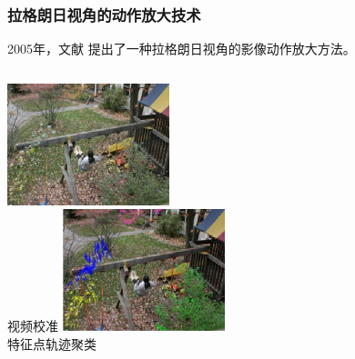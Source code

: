 \documentclass[xcolor=svgnames,serif,table]{beamer}
\begin{document}
\begin{frame}
  \frametitle{拉格朗日视角的动作放大技术}
  2005年，文献 \cite{liu2005motion} 提出了一种拉格朗日视角的影像动作放大方法。

  \medskip
  
  \begin{columns}
    \tiny
    \centering
    \includegraphics[width=\textwidth]{lag1.png}\\
    视频校准
    \centering
    \includegraphics[width=\textwidth]{lag2.png}\\
    特征点轨迹聚类
    \centering

\end{columns}
\end{frame}
\end{document}
